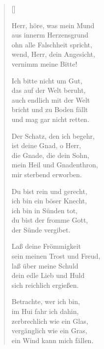 \begin{multicols}{2}
\settowidth{\versewidth}{Herr, höre, was mein Mund }
\begin{verse}[\versewidth]


 Herr, höre, was mein Mund\\
aus innerm Herzensgrund\\
ohn alle Falschheit spricht,\\
wend, Herr, dein Angesicht,\\
vernimm meine Bitte!

 Ich bitte nicht um Gut,\\
das auf der Welt beruht,\\
auch endlich mit der Welt\\
bricht und zu Boden fällt\\
und mag gar nicht retten.

 Der Schatz, den ich begehr,\\
ist deine Gnad, o Herr,\\
die Gnade, die dein Sohn,\\
mein Heil und Gnadenthron,\\
mir sterbend erworben.

 Du bist rein und gerecht,\\
ich bin ein böser Knecht,\\
ich bin in Sünden tot,\\
du bist der fromme Gott,\\
der Sünde vergibet.

 Laß deine Frömmigkeit\\
sein meinen Trost und Freud,\\
laß über meine Schuld\\
dein edle Lieb und Huld\\
sich reichlich ergießen.

 Betrachte, wer ich bin,\\
im Hui fahr ich dahin,\\
zerbrechlich wie ein Glas,\\
vergänglich wie ein Gras,\\
ein Wind kann mich fällen.


\end{verse}
\end{multicols}
